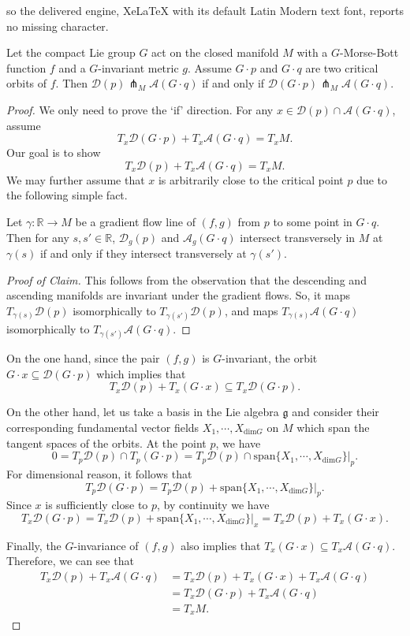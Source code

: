 \documentclass[10pt,a4paper]{amsart}
\newcommand{\R}{\mathbb{R}}
\newcommand{\asc}{\mathscr{A}}
\newcommand{\des}{\mathscr{D}}
\newcommand{\g}{\mathfrak{g}}
\begin{document}
so the delivered engine, XeLaTeX with its default Latin Modern text font, reports no missing character.
\begin{lemma}\label{lem:equivMBS}
    Let the compact Lie group $G$ act on the closed manifold $M$ with a $G$-Morse-Bott function $f$ and a $G$-invariant metric $g$. Assume $G\cdot p$ and $G\cdot q$ are two critical orbits of $f$. Then $\des(p)\pitchfork_M \asc(G\cdot q)$ if and only if $\des(G\cdot p)\pitchfork_M \asc(G\cdot q)$.
\end{lemma}

\begin{proof}
    We only need to prove the `if' direction. For any $x\in \des(p)\cap\asc(G\cdot q)$, assume \[T_x\des(G\cdot p)+T_x\asc(G\cdot q)=T_xM.\] Our goal is to show \[T_x\des(p)+T_x\asc(G\cdot q)=T_xM.\] We may further assume that $x$ is arbitrarily close to the critical point $p$ due to the following simple fact.
    \begin{claim}\label{claim:transverse}
   Let $\gamma: \R \to M$ be a gradient flow line of $(f,g)$ from $p$ to some point in $G\cdot q$. Then for any $s, s' \in \R$, $\des_{g}(p)$ and $\asc_{g}(G\cdot q)$ intersect transversely in $M$ at $\gamma(s)$ if and only if they  intersect transversely at $\gamma(s')$.
\end{claim}
\begin{proof}[Proof of Claim]
This follows from the observation that the descending and ascending manifolds are invariant under the gradient flows. So, it maps $T_{\gamma(s)} \des(p)$ isomorphically to $T_{\gamma(s')} \des(p)$, and maps $T_{\gamma(s)} \asc(G\cdot q)$ isomorphically to $T_{\gamma(s')} \asc(G\cdot q)$. 
\end{proof}

    
    On the one hand, since the pair $(f,g)$ is $G$-invariant, the orbit $G\cdot x\subseteq\des(G\cdot p)$ which implies that 
    \[T_x\des(p)+T_x(G\cdot x)\subseteq T_x\des(G\cdot p).\]
    
    On the other hand, let us take a basis in the Lie algebra  $\g$ and consider their corresponding fundamental vector fields $X_1,\cdots,X_{\text{dim}G}$ on $M$ which span the tangent spaces of the orbits. At the point $p$, we have\[0=T_p\des(p)\cap T_p(G\cdot p)=T_p\des(p)\cap \text{span}\{X_1,\cdots,X_{\text{dim}G}\}|_p.\] For dimensional reason, it follows that \[T_p\des(G\cdot p)=T_p\des(p)+\text{span}\{X_1,\cdots,X_{\text{dim}G}\}|_p.\] Since $x$ is sufficiently close to $p$, by continuity we have \[T_x\des(G\cdot p)=T_x\des(p)+\text{span}\{X_1,\cdots,X_{\text{dim}G}\}|_x=T_x\des(p)+ T_x (G\cdot x).\] 
    
    Finally, the $G$-invariance of $(f,g)$ also implies that $T_x(G\cdot x)\subseteq T_x\asc(G\cdot q)$. Therefore, we can see that 
    \begin{align*}
        T_x\des(p)+T_x\asc(G\cdot q)&= T_x\des(p)+T_x(G\cdot x)+T_x\asc(G\cdot q)\\
        &=T_x\des(G\cdot p)+T_x\asc(G\cdot q)\\
        &=T_xM.
    \end{align*}
\end{proof}
\end{document}
